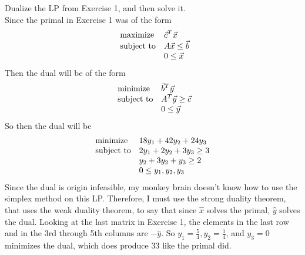 \documentclass[12pt]{article}
\newenvironment{exercise}[2][Exercise]{\begin{trivlist}
		\item[\hskip \labelsep {\bfseries #1}\hskip \labelsep {\bfseries #2.}]}{\end{trivlist}}
\begin{document}
	\begin{exercise}{2} Dualize the LP from Exercise 1, and then solve it.\\
		Since the primal in Exercise 1 was of the form
		\begin{equation*}
			\begin{array}{ll@{}ll}
				\text{maximize}  & \displaystyle \vec{c}^T\vec{x}\\
				\text{subject to}& \displaystyle A\vec{x} \leq \vec{b}\\
				& \displaystyle 0 \leq \vec{x}
			\end{array}
		\end{equation*}
		Then the dual will be of the form
		\begin{equation*}
			\begin{array}{ll@{}ll}
				\text{minimize}  & \displaystyle \vec{b}^T\vec{y}\\
				\text{subject to}& \displaystyle A^T\vec{y} \geq \vec{c}\\
				& \displaystyle 0 \leq \vec{y}
			\end{array}
		\end{equation*}
		So then the dual will be
		\begin{equation*}
			\begin{array}{ll@{}ll}
				\text{minimize}  & \displaystyle 18y_1 + 42y_2 + 24y_3 &\\
				\text{subject to}& \displaystyle 2y_1 + 2y_2 + 3y_3 \geq 3 \\
				& \displaystyle y_2 + 3y_2 + y_3 \geq 2 \\
				& \displaystyle 0 \leq y_1,y_2,y_3
			\end{array}
		\end{equation*}
		Since the dual is origin infeasible, my monkey brain doesn't know how to use the simplex method on this LP. Therefore, I must use the strong duality theorem, that uses the weak duality theorem, to say that since $\hat{x}$ solves the primal, $\hat{y}$ solves the dual. Looking at the last matrix in Exercise 1, the elements in the last row and in the 3rd through 5th columns are $-\hat{y}$. So $y_1 = \frac{5}{4}, y_2=\frac{1}{4}$, and $y_3=0$ minimizes the dual, which does produce 33 like the primal did.
	\end{exercise}
	
\end{document}

